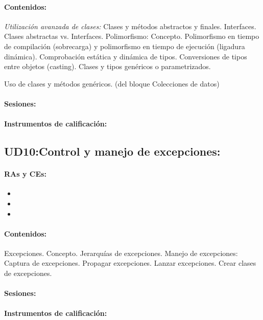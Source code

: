 	\paragraph{Contenidos:}
		\emph{Utilización avanzada de clases:}
		Clases y métodos abstractos y finales.
		Interfaces. Clases abstractas vs. Interfaces.
		Polimorfismo: Concepto.  Polimorfismo en tiempo de compilación (sobrecarga) y polimorfismo en tiempo de ejecución (ligadura dinámica).  Comprobación estática y dinámica de tipos.
		Conversiones de tipos entre objetos (casting).
		Clases y tipos genéricos o parametrizados.

		Uso de clases y métodos genéricos. (del bloque Colecciones de datos)

	\paragraph{Sesiones:}
	\paragraph{Instrumentos de calificación:}


\newpage
\subsection{UD10:Control y manejo de excepciones:}

	\paragraph{RAs y CEs:}
	\begin{itemize}[itemsep=0.1em, topsep=0.1em]
		\item\RATRESd
		\item\RATRESh
		\item\RATRESi		
	\end{itemize}
	\paragraph{Contenidos:}
		Excepciones. Concepto.
		Jerarquías de excepciones.
		Manejo de excepciones:  Captura de excepciones.  Propagar excepciones.  Lanzar excepciones.  Crear clases de excepciones.


	\paragraph{Sesiones:}
	\paragraph{Instrumentos de calificación:}




